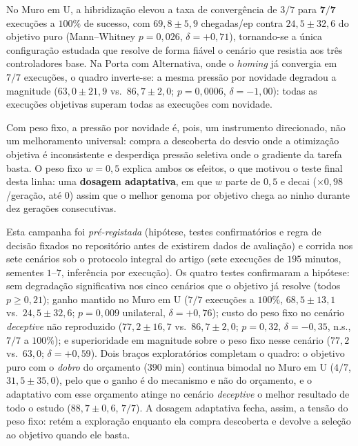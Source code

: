 \documentclass[final,5p,times,twocolumn,authoryear]{elsarticle}
\begin{document}
No Muro em U, a hibridização elevou a taxa de convergência de $3/7$ para
$\mathbf{7/7}$ execuções a $100\%$ de sucesso, com $69{,}8\pm5{,}9$ chegadas/ep
contra $24{,}5\pm32{,}6$ do objetivo puro (Mann--Whitney $p=0{,}026$, $\delta=+0{,}71$),
tornando-se a única configuração estudada que resolve de forma fiável o
cenário que resistia aos três controladores base. Na Porta com Alternativa, onde
o \emph{homing} já convergia em $7/7$ execuções, o quadro inverte-se: a mesma
pressão por novidade degradou a magnitude ($63{,}0\pm21{,}9$ vs.\ $86{,}7\pm2{,}0$;
$p=0{,}0006$, $\delta=-1{,}00$): todas as execuções objetivas superam todas as
execuções com novidade.

Com peso fixo, a pressão por novidade é, pois, um instrumento direcionado, não um
melhoramento universal: compra a descoberta do desvio onde a otimização objetiva é
inconsistente e desperdiça pressão seletiva onde o gradiente da tarefa basta. O
peso fixo $w=0{,}5$ explica ambos os efeitos, o que motivou o teste final desta
linha: uma \textbf{dosagem adaptativa}, em que $w$ parte de $0{,}5$ e decai
($\times 0{,}98$/geração, até $0$) assim que o melhor genoma por objetivo chega ao
ninho durante dez gerações consecutivas.

 Esta campanha foi \emph{pré-registada} (hipótese, testes confirmatórios e regra
de decisão fixados no repositório antes de existirem dados de avaliação) e
corrida nos sete cenários sob o protocolo integral do artigo (sete execuções de
$195$ minutos, sementes $1$--$7$, inferência por execução). Os quatro testes
confirmaram a hipótese: sem degradação significativa nos cinco cenários que o
objetivo já resolve (todos $p\geq 0{,}21$); ganho mantido no Muro em U ($7/7$
execuções a $100\%$, $68{,}5\pm13{,}1$ vs.\ $24{,}5\pm32{,}6$; $p=0{,}009$ unilateral,
$\delta=+0{,}76$); custo do peso fixo no cenário \emph{deceptive} não reproduzido
($77{,}2\pm16{,}7$ vs.\ $86{,}7\pm2{,}0$; $p=0{,}32$, $\delta=-0{,}35$, n.s., $7/7$ a
$100\%$); e superioridade em magnitude sobre o peso fixo nesse cenário ($77{,}2$
vs.\ $63{,}0$; $\delta=+0{,}59$). Dois braços exploratórios completam o quadro: o
objetivo puro com o \emph{dobro} do orçamento ($390$ min) continua bimodal no
Muro em U ($4/7$, $31{,}5\pm35{,}0$), pelo que o ganho é do mecanismo e não do orçamento,
e o adaptativo com esse orçamento atinge no cenário \emph{deceptive} o
melhor resultado de todo o estudo ($88{,}7\pm0{,}6$, $7/7$). A dosagem adaptativa
fecha, assim, a tensão do peso fixo: retém a exploração enquanto ela compra
descoberta e devolve a seleção ao objetivo quando ele basta.
\end{document}
